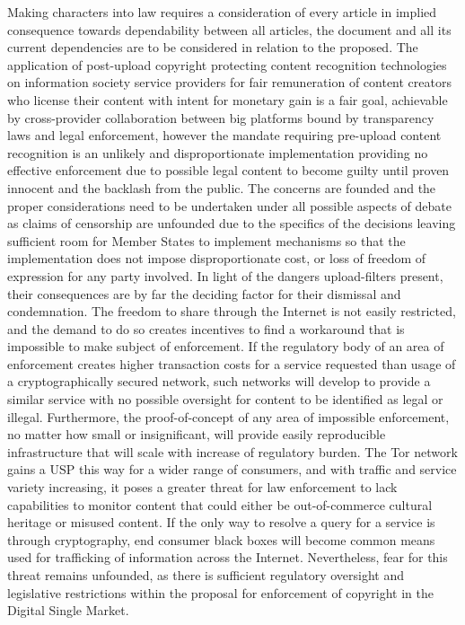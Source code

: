 \documentclass[a4paper]{article}
\begin{document}
Making characters into law requires a consideration of every article in implied consequence towards dependability between all articles, the document and all its current dependencies are to be considered in relation to the proposed. The application of post-upload copyright protecting content recognition technologies on information society service providers for fair remuneration of content creators who license their content with intent for monetary gain is a fair goal, achievable by cross-provider collaboration between big platforms bound by transparency laws and legal enforcement, however the mandate requiring pre-upload content recognition is an unlikely and disproportionate implementation providing no effective enforcement due to possible legal content to become guilty until proven innocent and the backlash from the public. The concerns are founded and the proper considerations need to be undertaken under all possible aspects of debate as claims of censorship are unfounded due to the specifics of the decisions leaving sufficient room for Member States to implement mechanisms so that the implementation does not impose disproportionate cost, or loss of freedom of expression for any party involved. In light of the dangers upload-filters present, their consequences are by far the deciding factor for their dismissal and condemnation. The freedom to share through the Internet is not easily restricted, and the demand to do so creates incentives to find a workaround that is impossible to make subject of enforcement. If the regulatory body of an area of enforcement creates higher transaction costs for a service requested than usage of a cryptographically secured network, such networks will develop to provide a similar service with no possible oversight for content to be identified as legal or illegal. Furthermore, the proof-of-concept of any area of impossible enforcement, no matter how small or insignificant, will provide easily reproducible infrastructure that will scale with increase of regulatory burden. The Tor network gains a USP this way for a wider range of consumers, and with traffic and service variety increasing, it poses a greater threat for law enforcement to lack capabilities to monitor content that could either be out-of-commerce cultural heritage or misused content. If the only way to resolve a query for a service is through cryptography, end consumer black boxes will become common means used for trafficking of information across the Internet. Nevertheless, fear for this threat remains unfounded, as there is sufficient regulatory oversight and legislative restrictions within the proposal for enforcement of copyright in the Digital Single Market. 
\end{document}
